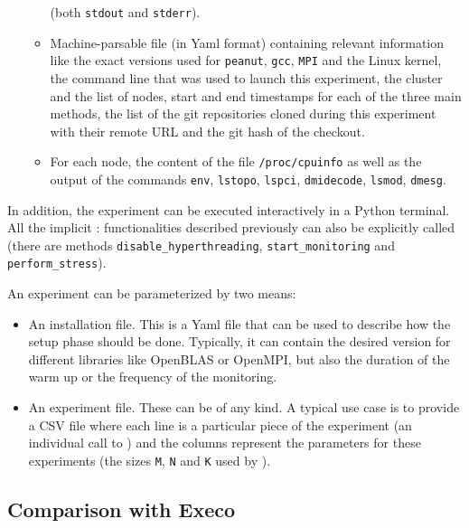 \begin{itemize}
\begin{itemize}
                            (both \texttt{stdout} and \texttt{stderr}).
                        \item Machine-parsable file (in Yaml format) containing relevant information like
                            the exact versions used for \texttt{peanut}, \texttt{gcc}, \texttt{MPI} and the Linux
                            kernel, the command line that was used to launch this experiment, the cluster and the list
                            of nodes, start and end timestamps for each of the three main methods, the list of the git
                            repositories cloned during this experiment with their remote URL and the git hash of the
                            checkout.
                        \item For each node, the content of the file \texttt{/proc/cpuinfo} as well as the output of the
                            commands \texttt{env}, \texttt{lstopo}, \texttt{lspci}, \texttt{dmidecode},
                            \texttt{lsmod}, \texttt{dmesg}.
                    \end{itemize}
            \end{itemize}
            In addition, the experiment can be executed interactively in a Python terminal. All the implicit
            : functionalities described previously can also be explicitly called (\eg there are methods
            \texttt{disable\_hyperthreading}, \texttt{start\_monitoring} and \texttt{perform\_stress}).

            An experiment can be parameterized by two means:
            \begin{itemize}
                \item An installation file. This is a Yaml file that can be used to describe how the setup phase should
                    be done. Typically, it can contain the desired version for different libraries like OpenBLAS or
                    OpenMPI, but also the duration of the warm up or the frequency of the monitoring.
                \item An experiment file. These can be of any kind. A typical use case is to provide a CSV file where
                    each line is a particular piece of the experiment (\eg an individual call to \dgemm) and the
                    columns represent the parameters for these experiments (\eg the sizes \texttt{M}, \texttt{N} and
                    \texttt{K} used by \dgemm).
            \end{itemize}

        \subsection{Comparison with Execo}%
        \label{sub:comparison_with_execo}

